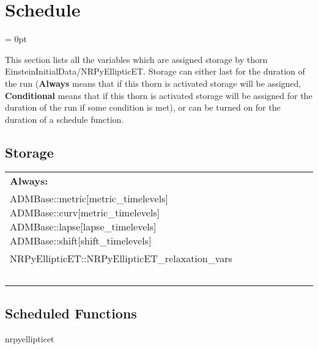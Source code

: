 
\section{Schedule} 


\parskip = 0pt


\noindent This section lists all the variables which are assigned storage by thorn EinsteinInitialData/NRPyEllipticET.  Storage can either last for the duration of the run ({\bf Always} means that if this thorn is activated storage will be assigned, {\bf Conditional} means that if this thorn is activated storage will be assigned for the duration of the run if some condition is met), or can be turned on for the duration of a schedule function.


\subsection*{Storage}

\hspace{5mm}

 \begin{tabular*}{160mm}{ll} 

{\bf Always:}&  ~ \\ 
 ADMBase::metric[metric\_timelevels] ADMBase::curv[metric\_timelevels] ADMBase::lapse[lapse\_timelevels] ADMBase::shift[shift\_timelevels] & ~\\ 
 NRPyEllipticET::NRPyEllipticET\_relaxation\_vars & ~\\ 
~ & ~\\ 
\end{tabular*} 


\subsection*{Scheduled Functions}
\vspace{5mm}


\hspace{5mm} nrpyellipticet 

\hspace{5mm}{\it set up metric fields for binary black hole initial data } 


\hspace{5mm}

